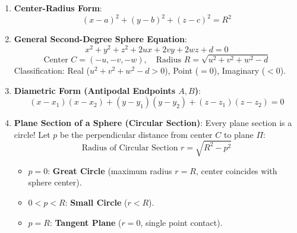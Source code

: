 \begin{theorembox}
\begin{enumerate}
    \item \textbf{Center-Radius Form}:
    \begin{equation}
        \boxed{(x - a)^2 + (y - b)^2 + (z - c)^2 = R^2}
    \end{equation}
    \item \textbf{General Second-Degree Sphere Equation}:
    \begin{equation}
        \boxed{x^2 + y^2 + z^2 + 2ux + 2vy + 2wz + d = 0}
    \end{equation}
    \begin{equation}
        \boxed{\text{Center } C = (-u, -v, -w), \quad \text{Radius } R = \sqrt{u^2 + v^2 + w^2 - d}}
    \end{equation}
    Classification: Real ($u^2+v^2+w^2-d > 0$), Point ($= 0$), Imaginary ($< 0$).
    \item \textbf{Diametric Form (Antipodal Endpoints $A, B$)}:
    \begin{equation}
        \boxed{(x - x_1)(x - x_2) + (y - y_1)(y - y_2) + (z - z_1)(z - z_2) = 0}
    \end{equation}
    \item \textbf{Plane Section of a Sphere (Circular Section)}:
    Every plane section is a circle! Let $p$ be the perpendicular distance from center $C$ to plane $\Pi$:
    \begin{equation}
        \boxed{\text{Radius of Circular Section } r = \sqrt{R^2 - p^2}}
    \end{equation}
    \begin{itemize}[noitemsep]
        \item $p = 0$: \textbf{Great Circle} (maximum radius $r = R$, center coincides with sphere center).
        \item $0 < p < R$: \textbf{Small Circle} ($r < R$).
        \item $p = R$: \textbf{Tangent Plane} ($r = 0$, single point contact).
    \end{itemize}
\end{enumerate}
\end{theorembox}

